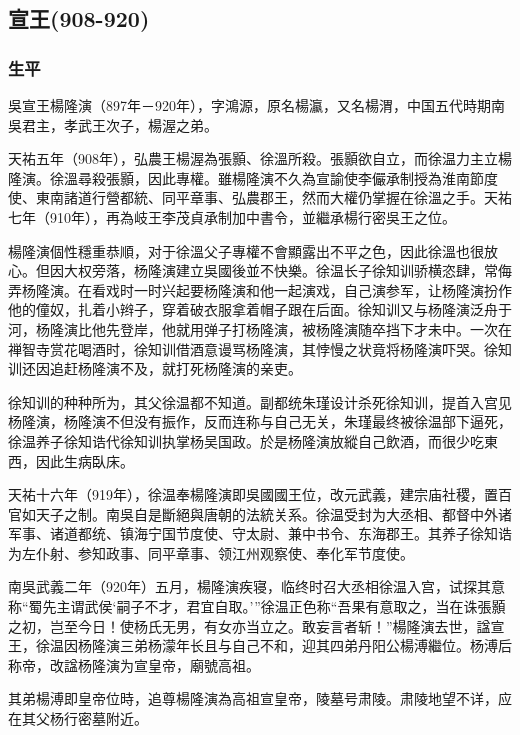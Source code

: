 
\subsection{宣王\tiny(908-920)}

\subsubsection{生平}

吳宣王楊隆演（897年－920年），字鴻源，原名楊瀛，又名楊渭，中国五代時期南吳君主，孝武王次子，楊渥之弟。

天祐五年（908年），弘農王楊渥為張顥、徐溫所殺。張顥欲自立，而徐温力主立楊隆演。徐溫尋殺張顥，因此專權。雖楊隆演不久為宣諭使李儼承制授為淮南節度使、東南諸道行營都統、同平章事、弘農郡王，然而大權仍掌握在徐溫之手。天祐七年（910年），再為岐王李茂貞承制加中書令，並繼承楊行密吳王之位。

楊隆演個性穩重恭順，对于徐溫父子專權不會顯露出不平之色，因此徐溫也很放心。但因大权旁落，杨隆演建立吳國後並不快樂。徐温长子徐知训骄横恣肆，常侮弄杨隆演。在看戏时一时兴起要杨隆演和他一起演戏，自己演参军，让杨隆演扮作他的僮奴，扎着小辫子，穿着破衣服拿着帽子跟在后面。徐知训又与杨隆演泛舟于河，杨隆演比他先登岸，他就用弹子打杨隆演，被杨隆演随卒挡下才未中。一次在禅智寺赏花喝酒时，徐知训借酒意谩骂杨隆演，其悖慢之状竟将杨隆演吓哭。徐知训还因追赶杨隆演不及，就打死杨隆演的亲吏。

徐知训的种种所为，其父徐温都不知道。副都统朱瑾设计杀死徐知训，提首入宫见杨隆演，杨隆演不但没有振作，反而连称与自己无关，朱瑾最终被徐温部下逼死，徐温养子徐知诰代徐知训执掌杨吴国政。於是杨隆演放縱自己飲酒，而很少吃東西，因此生病臥床。

天祐十六年（919年），徐温奉楊隆演即吳國國王位，改元武義，建宗庙社稷，置百官如天子之制。南吳自是斷絕與唐朝的法統关系。徐温受封为大丞相、都督中外诸军事、诸道都统、镇海宁国节度使、守太尉、兼中书令、东海郡王。其养子徐知诰为左仆射、参知政事、同平章事、领江州观察使、奉化军节度使。

南吳武義二年（920年）五月，楊隆演疾寝，临终时召大丞相徐温入宫，试探其意称“蜀先主谓武侯‘嗣子不才，君宜自取。’”徐温正色称“吾果有意取之，当在诛張顥之初，岂至今日！使杨氏无男，有女亦当立之。敢妄言者斩！”楊隆演去世，諡宣王，徐温因杨隆演三弟杨濛年长且与自己不和，迎其四弟丹阳公楊溥繼位。杨溥后称帝，改諡杨隆演为宣皇帝，廟號高祖。

其弟楊溥即皇帝位時，追尊楊隆演為高祖宣皇帝，陵墓号肃陵。肃陵地望不详，应在其父杨行密墓附近。


